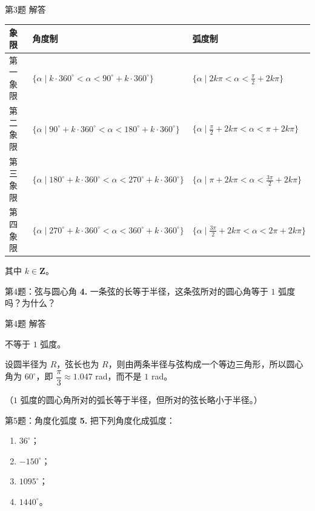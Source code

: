 \documentclass[10pt,aspectratio=169,serif]{beamer}
\begin{document}
\begin{frame}[t]{第3题 解答}
\begin{tcolorbox}[colback=orange!10,colframe=orange,title=\textbf{解}]
\small
\begin{tabular}{lll}
\toprule
象限 & 角度制 & 弧度制 \\
\midrule
第一象限 & $\{\alpha\mid k\cdot360^\circ<\alpha<90^\circ+k\cdot360^\circ\}$ & $\{\alpha\mid 2k\pi<\alpha<\frac{\pi}{2}+2k\pi\}$ \\
第二象限 & $\{\alpha\mid 90^\circ+k\cdot360^\circ<\alpha<180^\circ+k\cdot360^\circ\}$ & $\{\alpha\mid \frac{\pi}{2}+2k\pi<\alpha<\pi+2k\pi\}$ \\
第三象限 & $\{\alpha\mid 180^\circ+k\cdot360^\circ<\alpha<270^\circ+k\cdot360^\circ\}$ & $\{\alpha\mid \pi+2k\pi<\alpha<\frac{3\pi}{2}+2k\pi\}$ \\
第四象限 & $\{\alpha\mid 270^\circ+k\cdot360^\circ<\alpha<360^\circ+k\cdot360^\circ\}$ & $\{\alpha\mid \frac{3\pi}{2}+2k\pi<\alpha<2\pi+2k\pi\}$ \\
\bottomrule
\end{tabular}
\vspace{0.5em}
其中 $k\in\mathbf{Z}$。
\end{tcolorbox}
\end{frame}

\begin{frame}[t]{第4题：弦与圆心角}
\textbf{4.} 一条弦的长等于半径，这条弦所对的圆心角等于 $1$ 弧度吗？为什么？
\end{frame}

\begin{frame}[t]{第4题 解答}
\begin{tcolorbox}[colback=orange!10,colframe=orange,title=\textbf{解}]
\alert{不等于} $1$ 弧度。

\vspace{0.5em}
设圆半径为 $R$，弦长也为 $R$，则由两条半径与弦构成一个\alert{等边三角形}，所以圆心角为 $60^\circ$，即 $\dfrac{\pi}{3}\approx 1.047$ rad，而不是 $1$ rad。

\vspace{0.5em}
\small（$1$ 弧度的圆心角所对的弧长等于半径，但所对的弦长略小于半径。）
\end{tcolorbox}
\end{frame}

\begin{frame}[t]{第5题：角度化弧度}
\textbf{5.} 把下列角度化成弧度：
\begin{enumerate}
  \item $36^\circ$；
  \item $-150^\circ$；
  \item $1095^\circ$；
  \item $1440^\circ$。
\end{enumerate}
\end{frame}
\end{document}
